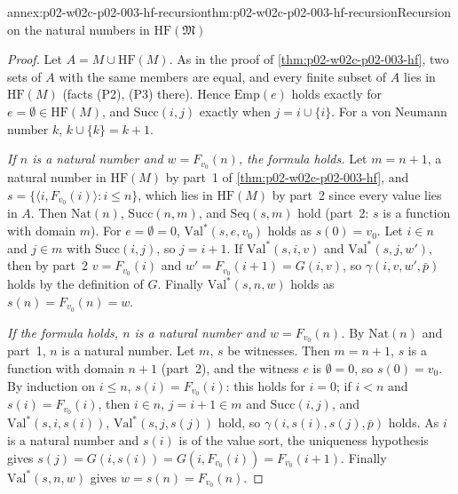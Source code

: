 \begin{annexitem}{annex:p02-w02c-p02-003-hf-recursion}{thm:p02-w02c-p02-003-hf-recursion}{Recursion on the natural numbers in \(\mathrm{HF}(\mathfrak M)\)}
\begin{proof}
Let \(A=M\cup\mathrm{HF}(M)\).  As in the proof of
\cref{thm:p02-w02c-p02-003-hf}, two sets of \(A\) with the same members are
equal, and every finite subset of \(A\) lies in \(\mathrm{HF}(M)\) (facts
(P2), (P3) there).  Hence \(\mathrm{Emp}(e)\) holds exactly for
\(e=\emptyset\in\mathrm{HF}(M)\), and \(\mathrm{Succ}(i,j)\) exactly when
\(j=i\cup\{i\}\).  For a von Neumann number \(k\), \(k\cup\{k\}=k+1\).

\emph{If \(n\) is a natural number and \(w=F_{v_0}(n)\), the formula
holds.}  Let \(m=n+1\), a natural number in \(\mathrm{HF}(M)\) by part~1 of
\cref{thm:p02-w02c-p02-003-hf}, and
\(s=\{\langle i,F_{v_0}(i)\rangle:i\leq n\}\), which lies in
\(\mathrm{HF}(M)\) by part~2 since every value lies in \(A\).  Then
\(\mathrm{Nat}(n)\), \(\mathrm{Succ}(n,m)\), and \(\mathrm{Seq}(s,m)\)
hold (part~2: \(s\) is a function with domain \(m\)).  For
\(e=\emptyset=0\), \(\mathrm{Val}^{\ast}(s,e,v_0)\) holds as
\(s(0)=v_0\).  Let \(i\in n\) and \(j\in m\) with \(\mathrm{Succ}(i,j)\),
so \(j=i+1\).  If \(\mathrm{Val}^{\ast}(s,i,v)\) and
\(\mathrm{Val}^{\ast}(s,j,w')\), then by part~2 \(v=F_{v_0}(i)\) and
\(w'=F_{v_0}(i+1)=G(i,v)\), so \(\gamma(i,v,w',\bar p)\) holds by the
definition of \(G\).  Finally \(\mathrm{Val}^{\ast}(s,n,w)\) holds as
\(s(n)=F_{v_0}(n)=w\).

\emph{If the formula holds, \(n\) is a natural number and
\(w=F_{v_0}(n)\).}  By \(\mathrm{Nat}(n)\) and part~1, \(n\) is a natural
number.  Let \(m\), \(s\) be witnesses.  Then \(m=n+1\), \(s\) is a
function with domain \(n+1\) (part~2), and the witness \(e\) is
\(\emptyset=0\), so \(s(0)=v_0\).  By induction on \(i\leq n\),
\(s(i)=F_{v_0}(i)\): this holds for \(i=0\); if \(i<n\) and
\(s(i)=F_{v_0}(i)\), then \(i\in n\), \(j=i+1\in m\) and
\(\mathrm{Succ}(i,j)\), and \(\mathrm{Val}^{\ast}(s,i,s(i))\),
\(\mathrm{Val}^{\ast}(s,j,s(j))\) hold, so
\(\gamma(i,s(i),s(j),\bar p)\) holds.  As \(i\) is a natural number and
\(s(i)\) is of the value sort, the uniqueness hypothesis gives
\(s(j)=G(i,s(i))=G(i,F_{v_0}(i))=F_{v_0}(i+1)\).  Finally
\(\mathrm{Val}^{\ast}(s,n,w)\) gives \(w=s(n)=F_{v_0}(n)\).
\end{proof}
\end{annexitem}

